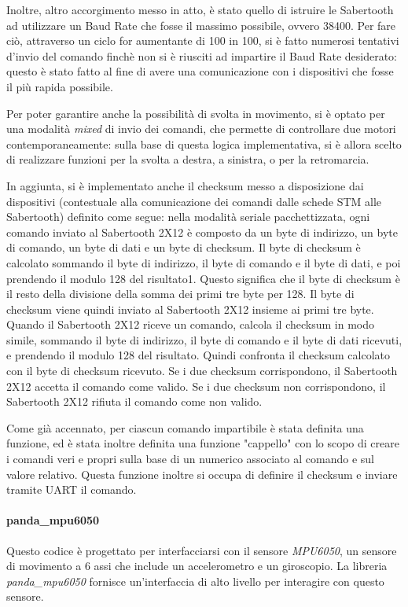 \documentclass{article}
\begin{document}
          Inoltre, altro accorgimento messo in atto, è stato quello di istruire le Sabertooth ad utilizzare un Baud Rate che fosse il massimo possibile, ovvero 38400. Per fare ciò, attraverso un ciclo for aumentante di 100 in 100, si è fatto numerosi tentativi d'invio del comando finchè non si è riusciti ad impartire il Baud Rate desiderato: questo è stato fatto al fine di avere una comunicazione con i dispositivi che fosse il più rapida possibile. 

          Per poter garantire anche la possibilità di svolta in movimento, si è optato per una modalità \textit{mixed} di invio dei comandi, che permette di controllare due motori contemporaneamente: sulla base di questa logica implementativa, si è allora scelto di realizzare funzioni per la svolta a destra, a sinistra, o per la retromarcia. 

          In aggiunta, si è implementato anche il checksum messo a disposizione dai dispositivi (contestuale alla comunicazione dei comandi dalle schede STM alle Sabertooth) definito come segue: nella modalità seriale pacchettizzata, ogni comando inviato al Sabertooth 2X12 è composto da un byte di indirizzo, un byte di comando, un byte di dati e un byte di checksum. Il byte di checksum è calcolato sommando il byte di indirizzo, il byte di comando e il byte di dati, e poi prendendo il modulo 128 del risultato1. Questo significa che il byte di checksum è il resto della divisione della somma dei primi tre byte per 128. Il byte di checksum viene quindi inviato al Sabertooth 2X12 insieme ai primi tre byte. Quando il Sabertooth 2X12 riceve un comando, calcola il checksum in modo simile, sommando il byte di indirizzo, il byte di comando e il byte di dati ricevuti, e prendendo il modulo 128 del risultato. Quindi confronta il checksum calcolato con il byte di checksum ricevuto. Se i due checksum corrispondono, il Sabertooth 2X12 accetta il comando come valido. Se i due checksum non corrispondono, il Sabertooth 2X12 rifiuta il comando come non valido.

          Come già accennato, per ciascun comando impartibile è stata definita una funzione, ed è stata inoltre definita una funzione "cappello" con lo scopo di creare i comandi veri e propri sulla base di un numerico associato al comando e sul valore relativo. Questa funzione inoltre si occupa di definire il checksum e inviare tramite UART il comando. 


          \paragraph{panda\_mpu6050} Questo codice è progettato per interfacciarsi con il sensore \textit{MPU6050}, un sensore di movimento a 6 assi che include un accelerometro e un giroscopio. La libreria \textit{panda\_mpu6050} fornisce un’interfaccia di alto livello per interagire con questo sensore.
\end{document}
